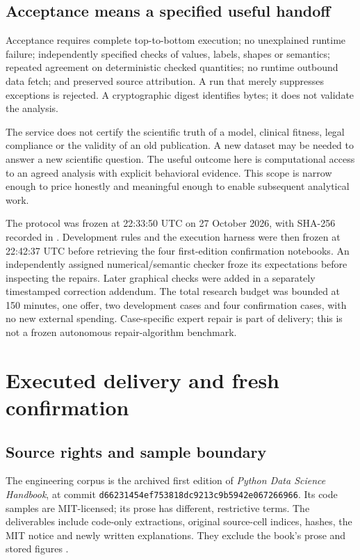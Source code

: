 \subsection{Acceptance means a specified useful handoff}
Acceptance requires complete top-to-bottom execution; no unexplained runtime failure; independently specified checks of values, labels, shapes or semantics; repeated agreement on deterministic checked quantities; no runtime outbound data fetch; and preserved source attribution. A run that merely suppresses exceptions is rejected. A cryptographic digest identifies bytes; it does not validate the analysis.

The service does not certify the scientific truth of a model, clinical fitness, legal compliance or the validity of an old publication. A new dataset may be needed to answer a new scientific question. The useful outcome here is computational access to an agreed analysis with explicit behavioral evidence. This scope is narrow enough to price honestly and meaningful enough to enable subsequent analytical work.

The protocol was frozen at 22:33:50 UTC on 27 October 2026, with SHA-256 recorded in . Development rules and the execution harness were then frozen at 22:42:37 UTC before retrieving the four first-edition confirmation notebooks. An independently assigned numerical/semantic checker froze its expectations before inspecting the repairs. Later graphical checks were added in a separately timestamped correction addendum. The total research budget was bounded at 150 minutes, one offer, two development cases and four confirmation cases, with no new external spending. Case-specific expert repair is part of delivery; this is not a frozen autonomous repair-algorithm benchmark.

\section{Executed delivery and fresh confirmation}
\subsection{Source rights and sample boundary}
The engineering corpus is the archived first edition of \emph{Python Data Science Handbook}, at commit \texttt{d66231454ef753818dc9213c9b5942e067266966}. Its code samples are MIT-licensed; its prose has different, restrictive terms. The deliverables include code-only extractions, original source-cell indices, hashes, the MIT notice and newly written explanations. They exclude the book's prose and stored figures \citep{handbook}.

